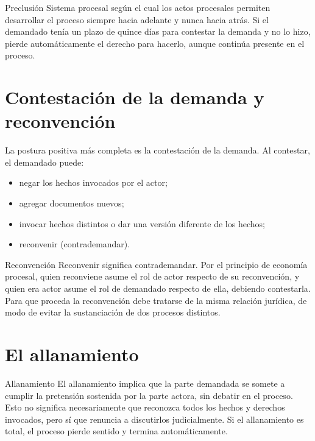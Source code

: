 \documentclass[12pt,oneside]{book}
\begin{document}
\begin{definition}{Preclusión}
Sistema procesal según el cual los actos procesales permiten desarrollar el proceso siempre hacia adelante y nunca hacia atrás. Si el demandado tenía un plazo de quince días para contestar la demanda y no lo hizo, pierde automáticamente el derecho para hacerlo, aunque continúa presente en el proceso.
\end{definition}

\section{Contestación de la demanda y reconvención}

La postura positiva más completa es la contestación de la demanda. Al contestar, el demandado puede:

\begin{itemize}
    \item negar los hechos invocados por el actor;
    \item agregar documentos nuevos;
    \item invocar hechos distintos o dar una versión diferente de los hechos;
    \item reconvenir (contrademandar).
\end{itemize}

\begin{definition}{Reconvención}
Reconvenir significa contrademandar. Por el principio de economía procesal, quien reconviene asume el rol de actor respecto de su reconvención, y quien era actor asume el rol de demandado respecto de ella, debiendo contestarla. Para que proceda la reconvención debe tratarse de la misma relación jurídica, de modo de evitar la sustanciación de dos procesos distintos.
\end{definition}

\section{El allanamiento}

\begin{definition}{Allanamiento}
El allanamiento implica que la parte demandada se somete a cumplir la pretensión sostenida por la parte actora, sin debatir en el proceso. Esto no significa necesariamente que reconozca todos los hechos y derechos invocados, pero sí que renuncia a discutirlos judicialmente. Si el allanamiento es total, el proceso pierde sentido y termina automáticamente.
\end{definition}
\end{document}
